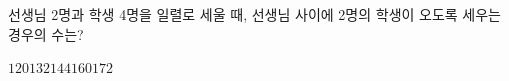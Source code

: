 선생님 2명과 학생 4명을 일렬로 세울 때, 선생님 사이에 2명의 학생이 오도록 세우는 경우의 수는?
\begin{choices32}{$120$}{$132$}{$144$}{$160$}{$172$}\end{choices32}
